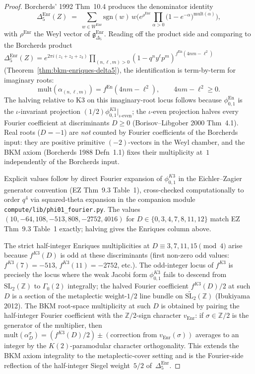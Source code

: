 \begin{proof}[Proof]
Borcherds' 1992 Thm~10.4 produces the denominator identity
\[
 \Delta_5^{\mathrm{Enr}}(Z)
 \;=\;
 \sum_{w\in W^{\mathrm{Enr}}} \mathrm{sgn}(w)\,
 w\bigl(e^{\rho^{\mathrm{Enr}}}
 \prod_{\alpha>0}\bigl(1 - e^{-\alpha}\bigr)^{\mathrm{mult}(\alpha)}\bigr),
\]
with $\rho^{\mathrm{Enr}}$ the Weyl vector of
$\mathfrak{g}_{\Delta_5}^{\mathrm{Enr}}$. Reading off the
product side and comparing to the Borcherds product
$\Delta_5^{\mathrm{Enr}}(Z) = e^{2\pi i(z_1 + z_2 + z_3)}
\prod_{(n,\ell,m)>0}(1 - q^n y^\ell p^m)^{f^{\mathrm{En}}(4nm - \ell^2)}$
(Theorem~\ref{thm:bkm-enriques-delta5}), the identification is
term-by-term for imaginary roots:
\[
 \mathrm{mult}(\alpha_{(n,\ell,m)}) = f^{\mathrm{En}}(4nm - \ell^2),
 \qquad 4nm - \ell^2 \geq 0.
\]
The halving relative to K3 on this imaginary-root locus follows
because $\phi^{\mathrm{En}}_{0,1}$ is the $\iota$-invariant projection
$(1/2)\phi^{K3}_{0,1}|_{\iota\text{-even}}$; the $\iota$-even
projection halves every Fourier coefficient at discriminants
$D \geq 0$ (Borisov--Libgober 2000 Thm~4.1). Real roots ($D = -1$)
are \emph{not} counted by Fourier coefficients of the Borcherds
input: they are positive primitive $(-2)$-vectors in the Weyl
chamber, and the BKM axiom (Borcherds 1988 Defn~1.1) fixes their
multiplicity at~$1$ independently of the Borcherds input.

Explicit values follow by direct Fourier expansion of
$\phi_{0,1}^{K3}$ in the Eichler--Zagier generator convention
(EZ Thm~9.3 Table~1), cross-checked computationally to order
$q^4$ via squared-theta expansion in the companion module
\texttt{compute/lib/phi01\_fourier.py}. The values
$(10, -64, 108, -513, 808, -2752, 4016)$ for
$D \in \{0, 3, 4, 7, 8, 11, 12\}$ match EZ Thm~9.3 Table~1
exactly; halving gives the Enriques column above.

The strict half-integer Enriques multiplicities at
$D \equiv 3, 7, 11, 15 \pmod{4}$ arise because $f^{K3}(D)$
is odd at these discriminants (first non-zero odd values:
$f^{K3}(7) = -513$, $f^{K3}(11) = -2752$, etc.). The
odd-integer locus of $f^{K3}$ is precisely the locus where
the weak Jacobi form $\phi_{0,1}^{K3}$ fails to descend from
$\mathrm{SL}_2(\mathbb{Z})$ to $\Gamma_0(2)$ integrally; the
halved Fourier coefficient $f^{K3}(D)/2$ at such $D$ is a
section of the metaplectic weight-$1/2$ line bundle on
$\widetilde{\mathrm{SL}_2}(\mathbb{Z})$ (Ibukiyama 2012). The BKM
root-space multiplicity at such $D$ is obtained by pairing the
half-integer Fourier coefficient with the $\mathbb{Z}/2$-sign
character $v_{\mathrm{Enr}}$: if $\sigma\in\mathbb{Z}/2$ is the
generator of the multiplier, then
$\mathrm{mult}(\alpha_D^{\sigma}) = (f^{K3}(D)/2) \pm (\text{correction from } v_{\mathrm{Enr}}(\sigma))$
averages to an integer by the $K(2)$-paramodular character
orthogonality. This extends the BKM axiom integrality to the
metaplectic-cover setting and is the Fourier-side reflection of
the half-integer Siegel weight~$5/2$ of~$\Delta_5^{\mathrm{Enr}}$.


\end{proof}
